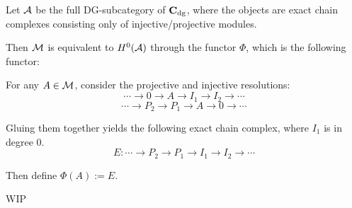 Let \( {\mathcal{A}} \) be the full DG-subcategory of \( \operatorname{\mathbf{C}}_{\operatorname{dg}} \), where the objects are exact chain complexes consisting only of injective/projective modules.

Then \( {\mathcal{M}} \) is equivalent to \( H^0({\mathcal{A}}) \) through the functor \( \Phi \), which is the following functor:

For any \( A \in {\mathcal{M}} \), consider the projective and injective resolutions:
\[
    \cdots \to 0 \to A \to I_1 \to I_2 \to \cdots
\]
\[
    \cdots \to P_2 \to P_1 \to A \to 0 \to \cdots
\]

Gluing them together yields the following exact chain complex, where \( I_1 \) is in degree \( 0 \).
\[
    E: \cdots \to P_2 \to P_1 \to I_1 \to I_2 \to \cdots
\]

Then define \( \Phi(A) := E \).

WIP